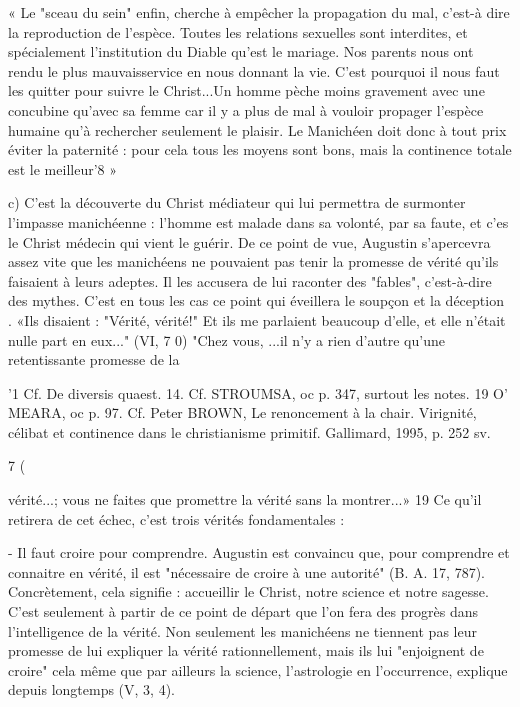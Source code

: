 « Le "sceau du sein" enfin, cherche à empêcher la propagation du mal, c'est-à­ dire la reproduction de l'espèce. Toutes les relations sexuelles sont interdites, et spécialement l'institution du Diable qu'est le mariage. Nos parents nous ont rendu le plus mauvaisservice en nous donnant la vie. C'est pourquoi il nous faut les quitter pour suivre le Christ...Un homme pèche moins gravement avec une concubine qu'avec sa femme car il y a plus de mal à vouloir propager l'espèce humaine qu'à rechercher seulement le plaisir. Le Manichéen doit donc à tout prix éviter la paternité : pour cela tous les moyens sont bons, mais la continence totale est le meilleur'8 »

c)	C'est la découverte du Christ médiateur qui lui permettra de surmonter l'impasse manichéenne : l'homme est malade dans sa volonté, par sa faute, et c'es le Christ médecin qui vient le guérir. De ce point de vue, Augustin s'apercevra assez vite que les manichéens ne pouvaient pas tenir la promesse de vérité qu'ils faisaient à leurs adeptes. Il les accusera de lui raconter des "fables", c'est-à-dire des mythes. C'est en tous les cas ce point qui éveillera le soupçon et la déception . «Ils disaient : "Vérité, vérité!" Et ils me parlaient beaucoup d'elle, et elle n'était nulle part en eux..." (VI, 7 0) "Chez vous, ...il n'y a rien d'autre qu'une retentissante promesse de la


'1 Cf. De diversis quaest. 14. Cf. STROUMSA, oc p. 347, surtout les notes.
19 O' MEARA, oc p. 97. Cf. Peter BROWN, Le renoncement à la chair. Virignité, célibat et continence dans le christianisme primitif. Gallimard, 1995, p. 252 sv.

7
(
 


vérité...; vous ne faites que promettre la vérité sans la montrer...» 19	Ce qu'il retirera de cet échec, c'est trois vérités fondamentales :

-	Il faut croire pour comprendre. Augustin est convaincu que, pour comprendre et connaitre en vérité, il est "nécessaire de croire à une autorité" (B. A. 17, 787). Concrètement, cela signifie : accueillir le Christ, notre science et notre sagesse. C'est seulement à partir de ce point de départ que l'on fera des progrès dans l'intelligence de la vérité. Non seulement les manichéens ne tiennent pas leur promesse de lui expliquer la vérité rationnellement, mais ils lui "enjoignent de croire" cela
même que par ailleurs la science, l'astrologie en l'occurrence, explique depuis longtemps (V, 3, 4).

